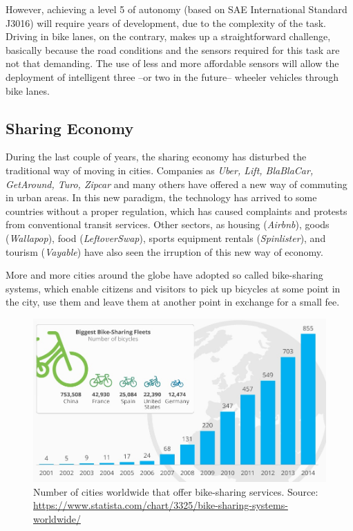 However, achieving a level 5 of autonomy (based on SAE International Standard J3016\cite{SAEj3016}) will require years of development, due to the complexity of the task. Driving in bike lanes, on the contrary, makes up a straightforward challenge, basically because the road conditions and the sensors required for this task are not that demanding. The use of less and more affordable sensors will allow the deployment of intelligent three --or two in the future-- wheeler vehicles through bike lanes.

\subsection{Sharing Economy}

During the last couple of years, the sharing economy has disturbed the traditional way of moving in cities. Companies as \textit{Uber, Lift, BlaBlaCar, GetAround, Turo, Zipcar} and many others have offered a new way of commuting in urban areas. In this new paradigm, the technology has arrived to some countries without a proper regulation, which has caused complaints and protests from conventional transit services.
Other sectors, as housing (\textit{Airbnb}), goods (\textit{Wallapop}), food (\textit{LeftoverSwap}), sports equipment rentals (\textit{Spinlister}), and tourism (\textit{Vayable}) have also seen the irruption of this new way of economy.

More and more cities around the globe have adopted so called bike-sharing systems, which enable citizens and visitors to pick up bicycles at some point in the city, use them and leave them at another point in exchange for a small fee.

\newpage

\begin{figure}[t]
	\includegraphics[width=\linewidth]{figs/01/Bike_Sharing_Systems_Worldwide}
	\caption{Number of cities worldwide that offer bike-sharing services. Source: \url{https://www.statista.com/chart/3325/bike-sharing-systems-worldwide/}}
\end{figure}




